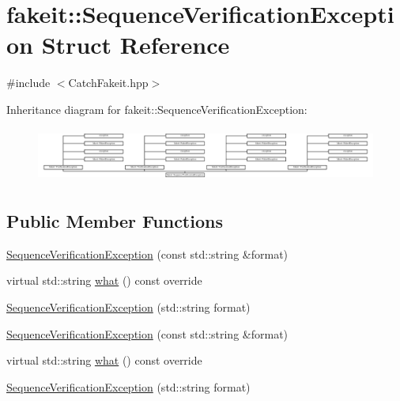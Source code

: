 \hypertarget{structfakeit_1_1SequenceVerificationException}{}\section{fakeit\+::Sequence\+Verification\+Exception Struct Reference}
\label{structfakeit_1_1SequenceVerificationException}


{\ttfamily \#include $<$Catch\+Fakeit.\+hpp$>$}

Inheritance diagram for fakeit\+::Sequence\+Verification\+Exception\+:\begin{figure}[H]
\begin{center}
\leavevmode
\includegraphics[height=1.810345cm]{structfakeit_1_1SequenceVerificationException}
\end{center}
\end{figure}
\subsection*{Public Member Functions}
\begin{DoxyCompactItemize}
\item 
\mbox{\hyperlink{structfakeit_1_1SequenceVerificationException_a47865aff5b8c221e17bd4852df3379fc}{Sequence\+Verification\+Exception}} (const std\+::string \&format)
\item 
virtual std\+::string \mbox{\hyperlink{structfakeit_1_1SequenceVerificationException_a0346dd2569b455290bde744e57e87e89}{what}} () const override
\item 
\mbox{\hyperlink{structfakeit_1_1SequenceVerificationException_a3f635a7e6e4836ddabe8d74cc75899b7}{Sequence\+Verification\+Exception}} (std\+::string format)
\item 
\mbox{\hyperlink{structfakeit_1_1SequenceVerificationException_a47865aff5b8c221e17bd4852df3379fc}{Sequence\+Verification\+Exception}} (const std\+::string \&format)
\item 
virtual std\+::string \mbox{\hyperlink{structfakeit_1_1SequenceVerificationException_a0346dd2569b455290bde744e57e87e89}{what}} () const override
\item 
\mbox{\hyperlink{structfakeit_1_1SequenceVerificationException_a3f635a7e6e4836ddabe8d74cc75899b7}{Sequence\+Verification\+Exception}} (std\+::string format)
\end{DoxyCompactItemize}
